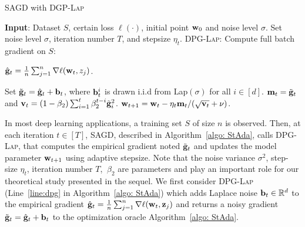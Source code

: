 \documentclass[11pt]{article}
\begin{document}
\begin{algorithm}[t] 
\caption{\textsc{SAGD} with \textsc{DGP-Lap}}
\begin{algorithmic}[1] \label{algo: StAda}
\STATE \textbf{Input}: Dataset $S$,  certain loss $\ell(\cdot)$, initial point $\mathbf{w}_0$ and noise level $\sigma$.
\STATE Set  noise level $\sigma$, iteration number $T$,  and stepsize $\eta_t$.
	\STATE  \textsc{DPG-Lap:} Compute full batch gradient on $S$: \\
	\centerline{ $\hat {\mathbf{g}}_t = \frac{1}{n} \sum_{j=1}^n\nabla \ell(\mathbf{w}_t, z_j)$.}	
	\STATE \label{line:dpg} Set $\tilde {\mathbf{g}}_t = \hat {\mathbf{g}}_t + \mathbf{b}_t$, where $\mathbf{b}_t^i$ is drawn i.i.d from Lap$(\sigma)$ for all $i \in [d]$.
\STATE  \label{line:adap1}
$\mathbf{m}_t = \tilde {\mathbf{g}}_t$ and $\mathbf{v}_t = \left(1-\beta_{2}\right) \sum_{i=1}^{t} \beta_{2}^{t-i} \tilde {\mathbf{g}}_{i}^{2}$.
\STATE  \label{line:adap2} $\mathbf{w}_{t+1}=\mathbf{w}_{t}-\eta_t \mathbf{m}_t /(\sqrt{\mathbf{v}_t}+\nu)$.
\ENDFOR 
\end{algorithmic}
\end{algorithm}
In most deep learning applications, a training set $S$ of size $n$ is observed.
Then, at each iteration $t \in [T]$, \textsc{SAGD}, described in Algorithm~\ref{algo: StAda}, calls \textsc{DPG-Lap}, that computes the empirical gradient noted $\tilde {\mathbf{g}}_t$ and updates the model parameter $\mathbf{w}_{t+1}$ using adaptive stepsize.
Note that the noise variance $\sigma^2$, step-size $\eta_t$, iteration number $T$, $~ \beta_2$ are parameters and play an important role for our theoretical study presented in the sequel. 
We first consider \textsc{DPG-Lap} (Line~\ref{line:dpg} in Algorithm~\ref{algo: StAda}) which adds Laplace noise $\mathbf{b}_t \in \mathbb{R}^d$ to the empirical gradient $\hat {\mathbf{g}}_t = \frac{1}{n} \sum_{j=1}^n\nabla \ell(\mathbf{w}_t, \mathbf{z}_j)$ and returns a noisy gradient $\tilde {\mathbf{g}}_t = \hat {\mathbf{g}}_t + \mathbf{b}_t$ to the optimization oracle Algorithm~\ref{algo: StAda}.
\end{document}
